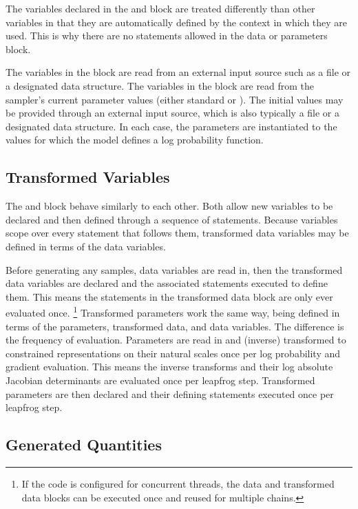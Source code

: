 The variables declared in the  and  block
are treated differently than other variables in that they are
automatically defined by the context in which they are used.  This is
why there are no statements allowed in the data or parameters block.

The variables in the  block are read from an external input
source such as a file or a designated \R data structure.  The
variables in the  block are read from the sampler's
current parameter values (either standard \HMC or \NUTS).  The initial
values may be provided through an external input source, which is also
typically a file or a designated \R data structure.  In each case, the
parameters are instantiated to the values for which the model defines
a log probability function.

\subsection{Transformed Variables}

The  and  block
behave similarly to each other.  Both allow new variables to be
declared and then defined through a sequence of statements.  Because
variables scope over every statement that follows them, transformed
data variables may be defined in terms of the data variables.

Before generating any samples, data variables are read in, then the
transformed data variables are declared and the associated statements
executed to define them.  This means the statements in the transformed
data block are only ever evaluated once.%
%
\footnote{If the \Cpp code is configured for concurrent threads, the
  data and transformed data blocks can be executed once and reused for
  multiple chains.}
%
Transformed parameters work the same way, being defined in terms of
the parameters, transformed data, and data variables.  The difference
is the frequency of evaluation.  Parameters are read in and (inverse)
transformed to constrained representations on their natural scales
once per log probability and gradient evaluation.  This means the
inverse transforms and their log absolute Jacobian determinants are
evaluated once per leapfrog step.  Transformed parameters are then
declared and their defining statements executed once per leapfrog
step.

\subsection{Generated Quantities}

